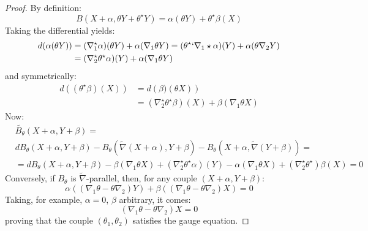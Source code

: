  \begin{proof}
 By definition:
 \begin{equation}
  B\left(X + \alpha, \theta Y + \theta^\star 
     Y \right) = \alpha\left(
     \theta Y \right) + \theta^\star \beta \left( X
     \right)
 \end{equation}
 Taking the differential yields:
 \begin{align}
  d\left(\alpha( \theta Y) \right) & =
 \left(\nabla_1^\star\alpha \right)(\theta Y) +
 \alpha\left(
 \nabla_1 \theta Y
 \right) = \left(\theta^\star `\nabla_1\star \alpha \right) (Y) + 
 \alpha\left(
  \theta \nabla_2 Y
 \right) \\
 & = \left(\nabla_2^\star \theta^\star \alpha \right)(Y)  + 
 \alpha\left(
  \nabla_1 \theta Y
 \right)
 \end{align}
 and symmetrically:
 \begin{align}
   d\left((\theta^\star \beta)( X) \right) & = d\left(\beta)( \theta X) \right) \\
    & = \left(\nabla_2^\star \theta^\star \beta \right)(X)  + 
 \beta\left(
  \nabla_1 \theta X
 \right)
 \end{align}
 Now:
 \begin{align}
 &\tilde{B_\theta}\left(X+\alpha, Y + \beta\right)= \\
 &  
 d{B_\theta}\left(X+\alpha, Y + \beta\right) 
 -B_\theta\left(\tilde{\nabla}(X+\alpha),Y+\beta\right)
 -B_\theta\left(X+\alpha,\tilde{\nabla}(Y+\beta)\right) = \\
 & =  d{B_\theta}\left(X+\alpha, Y + \beta\right) 
 -\beta\left( \nabla_1 \theta X \right) +
 \left(\nabla_2^\star \theta^\star \alpha\right)(Y) 
  -\alpha\left( \nabla_1 \theta X \right) +
 \left(\nabla_2^\star \theta^\star\right) \beta(X) = 0
 \end{align}
 Conversely, if $B_\theta$ is $\tilde{\nabla}$-parallel, then, for any couple $(X+\alpha,Y+\beta)$:
 \begin{equation}
    \alpha \left( \left(\nabla_1 \theta - \theta \nabla_2\right)Y\right) + 
    \beta \left(\left(\nabla_1 \theta - \theta \nabla_2 \right)  X \right) = 0
 \end{equation}
 Taking, for example, $\alpha = 0$, $\beta$ arbitrary, it comes:
 \begin{equation}
     \left(\nabla_1 \theta - \theta \nabla_2 \right)  X = 0
 \end{equation}
 proving that the couple $\left( \theta_1, \theta_2 \right)$ satisfies the gauge equation.
 \end{proof}

